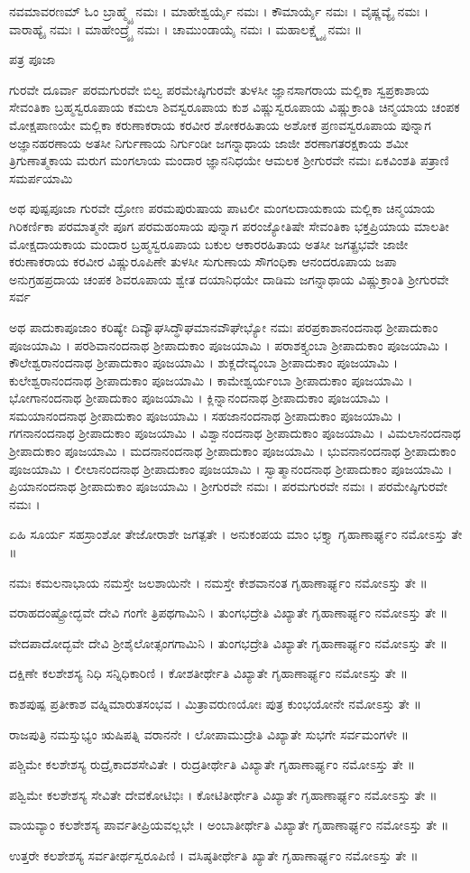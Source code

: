 ನವಮಾವರಣಮ್
ಓಂ ಬ್ರಾಹ್ಮ್ಯೈ ನಮಃ ।
ಮಾಹೇಶ್ವರ್ಯೈ ನಮಃ ।
ಕೌಮಾರ್ಯೈ ನಮಃ ।
ವೈಷ್ಣವ್ಯೈ ನಮಃ ।
ವಾರಾಹ್ಯೈ ನಮಃ ।
ಮಾಹೇಂದ್ರ್ಯೈ ನಮಃ ।
ಚಾಮುಂಡಾಯೈ ನಮಃ ।
ಮಹಾಲಕ್ಷ್ಮ್ಯೈ ನಮಃ ॥


ಪತ್ರ ಪೂಜಾ 

ಗುರವೇ ದೂರ್ವಾ
ಪರಮಗುರವೇ ಬಿಲ್ವ
ಪರಮೇಷ್ಠಿಗುರವೇ ತುಳಸೀ
ಜ್ಞಾನಸಾಗರಾಯ ಮಲ್ಲಿಕಾ
ಸ್ವಪ್ರಕಾಶಾಯ ಸೇವಂತಿಕಾ
ಬ್ರಹ್ಮಸ್ವರೂಪಾಯ ಕಮಲಾ
ಶಿವಸ್ವರೂಪಾಯ ಕುಶ
ವಿಷ್ಣುಸ್ವರೂಪಾಯ ವಿಷ್ಣುಕ್ರಾಂತಿ
ಚಿನ್ಮಯಾಯ ಚಂಪಕ
ಮೋಕ್ಷಪಾಣಯೇ ಮಲ್ಲಿಕಾ
ಕರುಣಾಕರಾಯ ಕರವೀರ
ಶೋಕರಹಿತಾಯ ಅಶೋಕ
ಪ್ರಣವಸ್ವರೂಪಾಯ ಪುನ್ನಾಗ
ಅಜ್ಞಾನಹರಣಾಯ ಅತಸೀ
ನಿರ್ಗುಣಾಯ ನಿರ್ಗುಂಡೀ
ಜಗನ್ನಾಥಾಯ ಜಾಜೀ
ಶರಣಾಗತರಕ್ಷಕಾಯ ಶಮೀ
ತ್ರಿಗುಣಾತ್ಮಕಾಯ ಮರುಗ
ಮಂಗಲಾಯ ಮಂದಾರ
ಜ್ಞಾನನಿಧಯೇ ಆಮಲಕ
ಶ್ರೀಗುರವೇ ನಮಃ ಏಕವಿಂಶತಿ ಪತ್ರಾಣಿ ಸಮರ್ಪಯಾಮಿ



ಅಥ ಪುಷ್ಪಪೂಜಾ
ಗುರವೇ ದ್ರೋಣ
ಪರಮಪುರುಷಾಯ ಪಾಟಲೀ
ಮಂಗಲದಾಯಕಾಯ ಮಲ್ಲಿಕಾ
ಚಿನ್ಮಯಾಯ ಗಿರಿಕರ್ಣಿಕಾ
ಪರಮಾತ್ಮನೇ ಪೂಗ
ಪರಮಹಂಸಾಯ ಪುನ್ನಾಗ
ಪರಂಜ್ಯೋತಿಷೇ ಸೇವಂತಿಕಾ
ಭಕ್ತಪ್ರಿಯಾಯ ಮಾಲತೀ
ಮೋಕ್ಷದಾಯಕಾಯ ಮಂದಾರ
ಬ್ರಹ್ಮಸ್ವರೂಪಾಯ ಬಕುಲ
ಆಕಾರರಹಿತಾಯ ಅತಸೀ
ಜಗತ್ಪ್ರಭವೇ ಜಾಜೀ
ಕರುಣಾಕರಾಯ ಕರವೀರ
ವಿಷ್ಣುರೂಪಿಣೇ ತುಳಸೀ
ಸುಗುಣಾಯ ಸೌಗಂಧಿಕಾ
ಆನಂದರೂಪಾಯ ಜಪಾ
ಅನುಗ್ರಹಪ್ರದಾಯ ಚಂಪಕ
ಶಿವರೂಪಾಯ ಶ್ವೇತ
ದಯಾನಿಧಯೇ ದಾಡಿಮ
ಜಗನ್ನಾಥಾಯ ವಿಷ್ಣುಕ್ರಾಂತಿ
ಶ್ರೀಗುರವೇ ಸರ್ವ


ಅಥ ಪಾದುಕಾಪೂಜಾಂ ಕರಿಷ್ಯೇ
ದಿವ್ಯೌಘಸಿದ್ಧೌಘಮಾನವೌಘೇಭ್ಯೋ ನಮಃ
ಪರಪ್ರಕಾಶಾನಂದನಾಥ ಶ್ರೀಪಾದುಕಾಂ ಪೂಜಯಾಮಿ ।
ಪರಶಿವಾನಂದನಾಥ ಶ್ರೀಪಾದುಕಾಂ ಪೂಜಯಾಮಿ ।
ಪರಾಶಕ್ತ್ಯಂಬಾ ಶ್ರೀಪಾದುಕಾಂ ಪೂಜಯಾಮಿ ।
ಕೌಲೇಶ್ವರಾನಂದನಾಥ ಶ್ರೀಪಾದುಕಾಂ ಪೂಜಯಾಮಿ ।
ಶುಕ್ಲದೇವ್ಯಂಬಾ ಶ್ರೀಪಾದುಕಾಂ ಪೂಜಯಾಮಿ ।
ಕುಲೇಶ್ವರಾನಂದನಾಥ ಶ್ರೀಪಾದುಕಾಂ ಪೂಜಯಾಮಿ ।
ಕಾಮೇಶ್ವರ್ಯಂಬಾ ಶ್ರೀಪಾದುಕಾಂ ಪೂಜಯಾಮಿ ।
ಭೋಗಾನಂದನಾಥ ಶ್ರೀಪಾದುಕಾಂ ಪೂಜಯಾಮಿ ।
ಕ್ಲಿನ್ನಾನಂದನಾಥ ಶ್ರೀಪಾದುಕಾಂ ಪೂಜಯಾಮಿ ।
ಸಮಯಾನಂದನಾಥ ಶ್ರೀಪಾದುಕಾಂ ಪೂಜಯಾಮಿ ।
ಸಹಜಾನಂದನಾಥ  ಶ್ರೀಪಾದುಕಾಂ ಪೂಜಯಾಮಿ ।
ಗಗನಾನಂದನಾಥ ಶ್ರೀಪಾದುಕಾಂ ಪೂಜಯಾಮಿ ।
ವಿಶ್ವಾನಂದನಾಥ ಶ್ರೀಪಾದುಕಾಂ ಪೂಜಯಾಮಿ ।
ವಿಮಲಾನಂದನಾಥ ಶ್ರೀಪಾದುಕಾಂ ಪೂಜಯಾಮಿ ।
ಮದನಾನಂದನಾಥ ಶ್ರೀಪಾದುಕಾಂ ಪೂಜಯಾಮಿ ।
ಭುವನಾನಂದನಾಥ ಶ್ರೀಪಾದುಕಾಂ ಪೂಜಯಾಮಿ ।
ಲೀಲಾನಂದನಾಥ ಶ್ರೀಪಾದುಕಾಂ ಪೂಜಯಾಮಿ ।
ಸ್ವಾತ್ಮಾನಂದನಾಥ ಶ್ರೀಪಾದುಕಾಂ ಪೂಜಯಾಮಿ ।
ಪ್ರಿಯಾನಂದನಾಥ ಶ್ರೀಪಾದುಕಾಂ ಪೂಜಯಾಮಿ ।
ಶ್ರೀಗುರವೇ ನಮಃ ।
ಪರಮಗುರವೇ ನಮಃ ।
ಪರಮೇಷ್ಠಿಗುರವೇ ನಮಃ ।

ಏಹಿ ಸೂರ್ಯ ಸಹಸ್ರಾಂಶೋ ತೇಜೋರಾಶೇ ಜಗತ್ಪತೇ ।
ಅನುಕಂಪಯ ಮಾಂ ಭಕ್ತ್ಯಾ ಗೃಹಾಣಾರ್ಘ್ಯಂ ನಮೋಽಸ್ತು ತೇ ॥

ನಮಃ ಕಮಲನಾಭಾಯ ನಮಸ್ತೇ ಜಲಶಾಯಿನೇ ।
ನಮಸ್ತೇ ಕೇಶವಾನಂತ ಗೃಹಾಣಾರ್ಘ್ಯಂ ನಮೋಽಸ್ತು ತೇ ॥

ವರಾಹದಂಷ್ಟ್ರೋದ್ಭವೇ ದೇವಿ ಗಂಗೇ ತ್ರಿಪಥಗಾಮಿನಿ ।
ತುಂಗಭದ್ರೇತಿ ವಿಖ್ಯಾತೇ ಗೃಹಾಣಾರ್ಘ್ಯಂ ನಮೋಽಸ್ತು ತೇ ॥

ವೇದಪಾದೋದ್ಭವೇ ದೇವಿ ಶ್ರೀಶೈಲೋತ್ಸಂಗಗಾಮಿನಿ ।
ತುಂಗಭದ್ರೇತಿ ವಿಖ್ಯಾತೇ ಗೃಹಾಣಾರ್ಘ್ಯಂ ನಮೋಽಸ್ತು ತೇ ॥

ದಕ್ಷಿಣೇ ಕಲಶೇಶಸ್ಯ ನಿಧಿ ಸನ್ನಿಧಿಕಾರಿಣಿ ।
ಕೋಶತೀರ್ಥೇತಿ ವಿಖ್ಯಾತೇ ಗೃಹಾಣಾರ್ಘ್ಯಂ ನಮೋಽಸ್ತು ತೇ ॥

ಕಾಶಪುಷ್ಪ ಪ್ರತೀಕಾಶ ವಹ್ನಿಮಾರುತಸಂಭವ ।
ಮಿತ್ರಾವರುಣಯೋಃ ಪುತ್ರ ಕುಂಭಯೋನೇ ನಮೋಽಸ್ತು ತೇ ॥

ರಾಜಪುತ್ರಿ ನಮಸ್ತುಭ್ಯಂ ಋಷಿಪತ್ನಿ ವರಾನನೇ ।
ಲೋಪಾಮುದ್ರೇತಿ ವಿಖ್ಯಾತೇ ಸುಭಗೇ ಸರ್ವಮಂಗಳೇ ॥

ಪಶ್ಚಿಮೇ ಕಲಶೇಶಸ್ಯ ರುದ್ರೈಕಾದಶಸೇವಿತೇ ।
ರುದ್ರತೀರ್ಥೇತಿ ವಿಖ್ಯಾತೇ ಗೃಹಾಣಾರ್ಘ್ಯಂ ನಮೋಽಸ್ತು ತೇ ॥

ಪಶ್ವಿಮೇ ಕಲಶೇಶಸ್ಯ ಸೇವಿತೇ ದೇವಕೋಟಿಭಿಃ ।
ಕೋಟಿತೀರ್ಥೇತಿ ವಿಖ್ಯಾತೇ ಗೃಹಾಣಾರ್ಘ್ಯಂ ನಮೋಽಸ್ತು ತೇ ॥

ವಾಯವ್ಯಾಂ ಕಲಶೇಶಸ್ಯ ಪಾರ್ವತೀಪ್ರಿಯವಲ್ಲಭೇ ।
ಅಂಬಾತೀರ್ಥೇತಿ ವಿಖ್ಯಾತೇ ಗೃಹಾಣಾರ್ಘ್ಯಂ ನಮೋಽಸ್ತು ತೇ ॥

ಉತ್ತರೇ ಕಲಶೇಶಸ್ಯ ಸರ್ವತೀರ್ಥಸ್ವರೂಪಿಣಿ ।
ವಸಿಷ್ಠತೀರ್ಥೇತಿ ಖ್ಯಾತೇ ಗೃಹಾಣಾರ್ಘ್ಯಂ ನಮೋಽಸ್ತು ತೇ ॥



